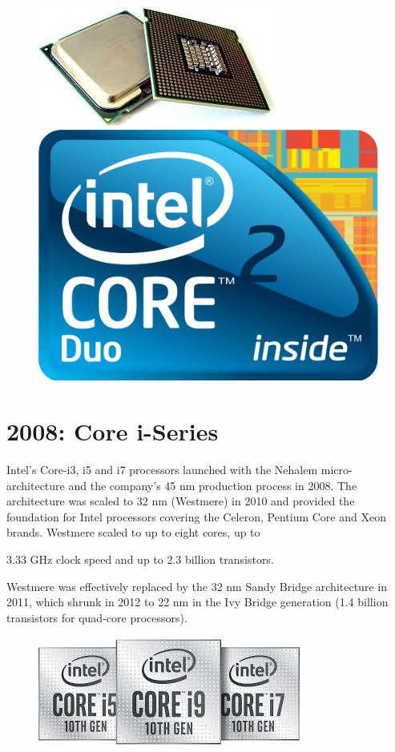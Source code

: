 \begin{figure}[ht!]
	\centering
\includegraphics[scale=0.5]{media/image25.jpeg}
	\includegraphics[scale=0.2]{media/image26.png}
\end{figure}

\section{2008: Core i-Series}

Intel's Core-i3, i5 and i7 processors launched with the Nehalem
micro-architecture and the company's 45 nm production process in 2008.
The architecture was scaled to 32 nm (Westmere) in 2010 and provided the
foundation for Intel processors covering the Celeron, Pentium Core and
Xeon brands. Westmere scaled to up to eight cores, up to

3.33 GHz clock speed and up to 2.3 billion transistors.

Westmere was effectively replaced by the 32 nm Sandy Bridge architecture
in 2011, which shrunk in 2012 to 22 nm in the Ivy Bridge generation (1.4
billion transistors for quad-core processors).

\begin{figure}[ht!]
	\centering
\includegraphics[scale=0.5]{media/image27.jpeg}
\end{figure}


